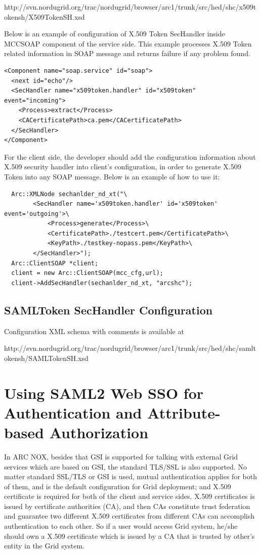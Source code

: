 \documentclass{article}                            %
\begin{document}
http://svn.nordugrid.org/trac/nordugrid/browser/arc1/trunk/src/hed/shc/x509tokensh/X509TokenSH.xsd

Below is an example of configuration of X.509 Token SecHandler inside MCCSOAP component of the service side. This example processes X.509 Token related information in SOAP message and returns failure if any problem found.

\begin{verbatim}
<Component name="soap.service" id="soap">
  <next id="echo"/>
  <SecHandler name="x509token.handler" id="x509token" event="incoming">
    <Process>extract</Process>
    <CACertificatePath>ca.pem</CACertificatePath>
  </SecHandler>
</Component>
\end{verbatim}

For the client side, the developer should add the configuration information about X.509 security handler into client's configuration, in order to generate X.509 Token into any SOAP message. Below is an example of how to use it:

\begin{verbatim}
  Arc::XMLNode sechanlder_nd_xt("\
        <SecHandler name='x509token.handler' id='x509token' event='outgoing'>\
            <Process>generate</Process>\
            <CertificatePath>./testcert.pem</CertificatePath>\
            <KeyPath>./testkey-nopass.pem</KeyPath>\
        </SecHandler>");
  Arc::ClientSOAP *client;
  client = new Arc::ClientSOAP(mcc_cfg,url);
  client->AddSecHandler(sechanlder_nd_xt, "arcshc");
\end{verbatim}


\subsection{SAMLToken SecHandler Configuration} %
\label{subsec:st_sechandler_conf}
Configuration XML schema with comments is available at

http://svn.nordugrid.org/trac/nordugrid/browser/arc1/trunk/src/hed/shc/samltokensh/SAMLTokenSH.xsd



\section{Using SAML2 Web SSO for Authentication and Attribute-based Authorization} %
\label{sec:samlsso}
   In ARC NOX, besides that GSI is supported for talking with external Grid services which are based on GSI, the standard TLS/SSL is also supported. No matter standard SSL/TLS or GSI is used, mutual authentication applies for both of them, and is the default configuration for Grid deployment; and X.509 certificate is required for both of the client and service sides. X.509 certificates is issued by certificate authorities (CA), and then CAs constitute trust federation and guarantee two different X.509 certificates from different CAs can accomplish authentication to each other. So if a user would access Grid system, he/she should own a X.509 certificate which is issued by a CA that is trusted by other's entity in the Grid system.
\end{document}
